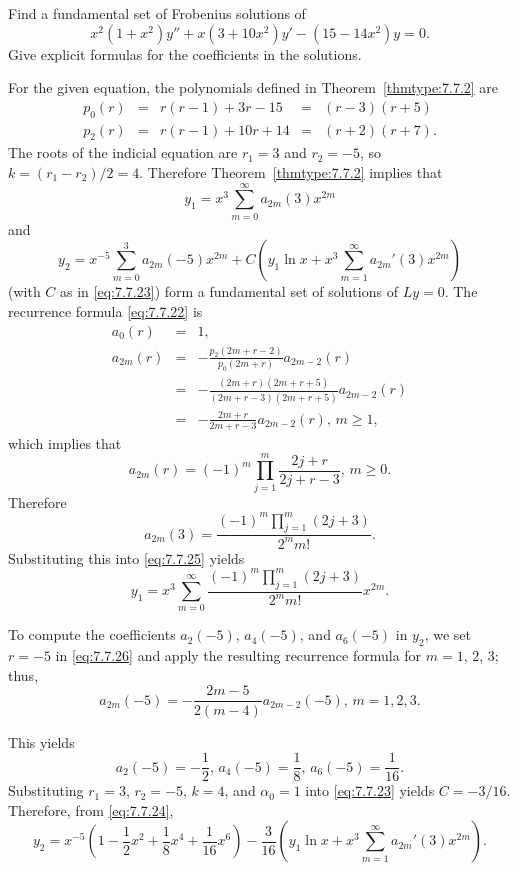 \documentclass{ximera}
\begin{document}
\begin{example}\label{example:7.7.3}
Find a fundamental set of Frobenius  solutions of
$$
x^2(1+x^2)y''+x(3+10x^2)y'-(15-14x^2)y=0.
$$
Give explicit  formulas for the coefficients in the solutions.

\begin{explanation}
For  the given equation, the polynomials defined in
Theorem~\ref{thmtype:7.7.2} are
$$
\begin{array}{ccccc}
p_0(r)&=&r(r-1)+3r-15&=&(r-3)(r+5)\\
p_2(r)&=&r(r-1)+10r+14&=&(r+2)(r+7).
\end{array}
$$
The roots of the indicial equation are $r_1=3$ and $r_2=-5$,
so $k=(r_1-r_2)/2=4$. Therefore Theorem~\ref{thmtype:7.7.2} implies that
\begin{equation} \label{eq:7.7.25}
y_1=x^3\sum_{m=0}^\infty a_{2m}(3)x^{2m}
\end{equation}
and
$$
y_2=x^{-5}\sum_{m=0}^3 a_{2m}(-5)x^{2m}+C
\left(y_1\ln x+x^3\sum_{m=1}^\infty a_{2m}'(3)x^{2m}\right)
$$
(with $C$ as in \eqref{eq:7.7.23})
form a fundamental set of solutions of $Ly=0$. The recurrence formula
\eqref{eq:7.7.22} is
\begin{equation} \label{eq:7.7.26}
\begin{array}{ccl}
a_0(r)&=&1,\\
a_{2m}(r)&=&-\frac{p_2(2m+r-2)}{p_0(2m+r)}a_{2m-2}(r)\\
&=&-\frac{(2m+r)(2m+r+5)}{(2m+r-3)(2m+r+5)}a_{2m-2}(r)\\
&=&-\frac{2m+r}{2m+r-3}a_{2m-2}(r),\,m\geq 1,
\end{array}
\end{equation}
which implies that
\begin{equation} \label{eq:7.7.27}
a_{2m}(r)=(-1)^m\prod_{j=1}^m\frac{2j+r}{2j+r-3},\,m\geq 0.
\end{equation}
Therefore
\begin{equation} \label{eq:7.7.28}
a_{2m}(3)=\frac{(-1)^m\prod_{j=1}^m(2j+3)}{2^mm!}.
\end{equation}
Substituting this into \eqref{eq:7.7.25} yields
$$
y_1=x^3\sum_{m=0}^\infty
\frac{(-1)^m\prod_{j=1}^m(2j+3)}{2^mm!}x^{2m}.
$$

To compute the coefficients $a_2(-5)$, $a_4(-5)$, and $a_6(-5)$ in
$y_2$, we
set $r=-5$ in \eqref{eq:7.7.26} and apply the resulting recurrence
formula for $m=1$, $2$,  $3$;   thus,
$$
a_{2m}(-5)=-\frac{2m-5}{2(m-4)}a_{2m-2}(-5),\,m=1,2,3.
$$

This yields
$$
a_2(-5)=-\frac{1}{2},\,a_4(-5)=\frac{1}{8},\,a_6(-5)=\frac{1}{16}.
$$
Substituting $r_1=3$, $r_2=-5$, $k=4$, and $\alpha_0=1$   into
\eqref{eq:7.7.23}
yields $C=-3/16$.   Therefore, from \eqref{eq:7.7.24},
\begin{equation} \label{eq:7.7.29}
y_2=x^{-5} \left(1-\frac{1}{2}x^2+\frac{1}{8}x^4+\frac{1}{16}x^6\right)
-\frac{3}{16}
\left(y_1\ln x+x^3\sum_{m=1}^\infty a_{2m}'(3)x^{2m}\right).
\end{equation}


\end{explanation}
\end{example}
\end{document}
